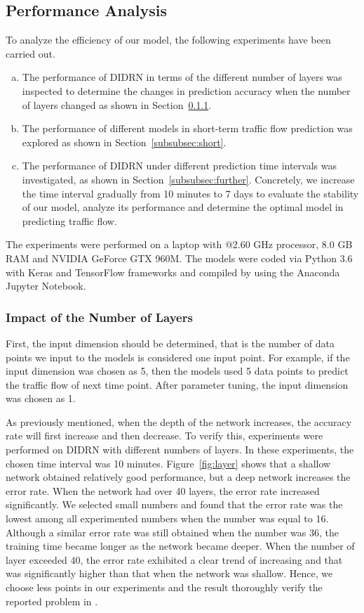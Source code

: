 \documentclass[twocolumn]{article}
\begin{document}
\subsection{Performance Analysis}
\par
To analyze the efficiency of our model, the following experiments have been carried out.
\begin{enumerate}[(a)]
    \item The performance of DIDRN in terms of the different number of layers was inspected to determine the changes in prediction accuracy when the number of layers changed as shown in Section~\ref{subsubsec:layers}.
    \item The performance of different models in short-term traffic flow prediction was explored as shown in Section~\ref{subsubsec:short}.
    \item The performance of DIDRN under different prediction time intervals was investigated, as shown in Section~\ref{subsubsec:further}. Concretely, we increase the time interval gradually from 10 minutes to 7 days to evaluate the stability of our model, analyze its performance and determine the optimal model in predicting traffic flow.
\end{enumerate}
\par
The experiments were performed on a laptop with @2.60 GHz processor, 8.0 GB RAM and NVIDIA GeForce GTX 960M. The models were coded via Python 3.6 with Keras and TensorFlow frameworks and compiled by using the Anaconda Jupyter Notebook.

\subsubsection{Impact of the Number of Layers}\label{subsubsec:layers}
\par
First, the input dimension should be determined, that is the number of data points we input to the models is considered one input point. For example, if the input dimension was chosen as 5, then the models used 5 data points to predict the traffic flow of next time point. After parameter tuning, the input dimension was chosen as 1. 
\par
As previously mentioned, when the depth of the network increases, the accuracy rate will first increase and then decrease. To verify this, experiments were performed on DIDRN with different numbers of layers. In these experiments, the chosen time interval was 10 minutes.
Figure~\ref{fig:layer} shows that a shallow network obtained relatively good performance, but a deep network increases the error rate.  When the network had over 40 layers, the error rate increased significantly. We selected small numbers and found that the error rate was the lowest among all experimented numbers when the number was equal to 16. Although a similar error rate was still obtained when the number was 36, the training time became longer as the network became deeper. When the number of layer exceeded 40, the error rate exhibited a clear trend of increasing and that was significantly higher than that when the network was shallow. Hence, we choose less points in our experiments and the result thoroughly verify the reported problem in \citep{srivastava2015highway,he2015convolutional,DRN}.
\end{document}
